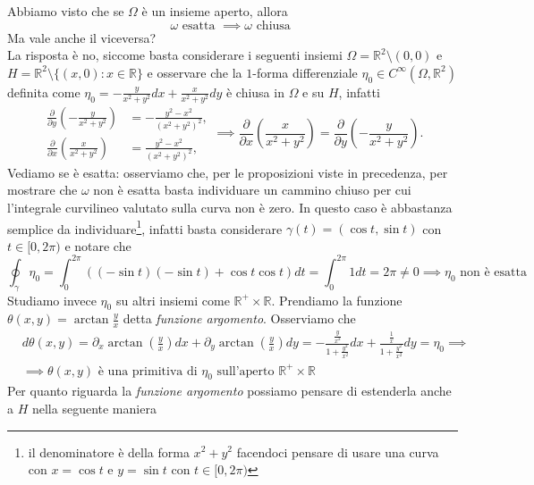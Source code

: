 \begin{remark}
Abbiamo visto che se $\Omega$ è un insieme aperto, allora
$$
\omega \text{ esatta } \implies \omega \text{ chiusa }
$$
Ma vale anche il viceversa? \\
La risposta è no, siccome basta considerare i seguenti insiemi $\Omega = \mathbb{R}^2 \setminus {(0, 0)}$ e $H = \mathbb{R}^2 \setminus \{(x, 0) : x \in \mathbb{R} \}$ e osservare che
la $1$-forma differenziale $\eta_0 \in C^\infty(\Omega, \mathbb{R}^2)$ definita come $\eta_0 = - \frac{y}{x^2 + y^2}dx + \frac{x}{x^2+y^2}dy$ è chiusa in $\Omega$ e su $H$, infatti
\begin{equation*}
	\begin{aligned}
		\frac{\partial}{\partial y} \left(- \frac{y}{x^2 + y^2} \right) &= - \frac{y^2 - x^2}{(x^2 + y^2)^2}, \\
		\frac{\partial}{\partial x} \left( \frac{x}{x^2 + y^2} \right) &= \frac{y^2 - x^2}{(x^2 + y^2)^2},
	\end{aligned}
	\implies 
	\frac{\partial}{\partial x} \left( \frac{x}{x^2 + y^2} \right) = \frac{\partial}{\partial y} \left( - \frac{y}{x^2 + y^2} \right).
	\end{equation*}	
Vediamo se è esatta: osserviamo che, per le proposizioni viste in precedenza, per mostrare che $\omega$ non è esatta basta individuare un cammino chiuso per cui l'integrale curvilineo valutato sulla curva non è zero. In questo caso è abbastanza semplice da individuare\footnote{il denominatore
è della forma $x^2 + y^2$ facendoci pensare di usare una curva con $x=\cos{t}$ e $y=\sin{t}$ con $t \in [0, 2 \pi)$}, infatti basta considerare $\gamma(t)=(\cos{t}, \sin{t})$ con $t \in [0, 2 \pi)$ e notare che
$$
\oint_\gamma \eta_0 = \int_0^{2 \pi} ((-\sin{t})(-\sin{t}) + \cos{t}\cos{t})dt = \int_0^{2 \pi} 1 dt = 2 \pi \neq 0 \implies \eta_0 \text{ non è esatta }
$$ \noindent
Studiamo invece $\eta_0$ su altri insiemi come $\mathbb{R}^+ \times \mathbb{R}$. Prendiamo la funzione $\theta(x, y) = \arctan{\frac{y}{x}}$ detta \emph{funzione argomento}. Osserviamo che
\begin{align*}
&d\theta(x, y) = \partial_x \arctan{ \left( \frac{y}{x} \right) }dx + \partial_y \arctan{ \left( \frac{y}{x} \right) }dy = -\frac{\frac{y}{x^2}}{1 + \frac{y^2}{x^2}}dx + \frac{\frac{1}{x}}{1 + \frac{y^2}{x^2}}dy = \eta_0 \implies \\
&\implies \theta(x, y) \text{ è una primitiva di } \eta_0 \text{ sull'aperto } \mathbb{R}^+ \times \mathbb{R} 
\end{align*}
Per quanto riguarda la \emph{funzione argomento} possiamo pensare di estenderla anche a $H$ nella seguente maniera

\end{remark}

